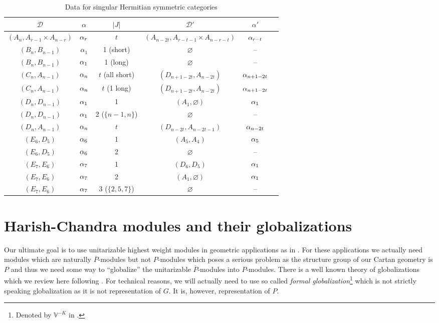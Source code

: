 \begin{table}[H] 
\begin{tabular}{cccccc}
$\mathcal{D}$ &  $\alpha$ & $|J|$ & $\mathcal{D}'$ & $\alpha'$    \\[2pt] \hline 
$(A_n,A_{r-1}\times A_{n-r})$ & $\alpha_r$   & $t$ & $(A_{n-2t},A_{r-t-1}\times A_{n-r-t})$ & $\alpha_{r-t}$ \\
$(B_n,B_{n-1})$ & $\alpha_1$   & 1 (short) & $\varnothing$  & --  \\
$(B_n,B_{n-1})$ & $\alpha_1$   & 1 (long) & $\varnothing$ & --  \\
$(C_n,A_{n-1})$ & $\alpha_n$   & $t$ (all short) & $(D_{n+1-2t},A_{n-2t})$  & $\alpha_{n+1-2t}$  \\
$(C_n,A_{n-1})$ & $\alpha_n$   & $t$ (1 long) & $(D_{n+1-2t},A_{n-2t})$  & $\alpha_{n+1-2t}$ \\
$(D_n,D_{n-1})$ & $\alpha_1$   & 1 & $(A_1,\varnothing)$  & $\alpha_1$  \\
$(D_n,D_{n-1})$ & $\alpha_1$   & 2 ($\{n-1,n\}$) & $\varnothing$  & --   \\
$(D_n,A_{n-1})$ & $\alpha_n$   & $t$ & $(D_{n-2t},A_{n-2t-1})$  & $\alpha_{n-2t}$  \\
$(E_6,D_5)$ & $\alpha_6$   & 1 & $(A_5,A_4)$  & $\alpha_5$ \\
$(E_6,D_5)$ & $\alpha_6$   & 2 & $\varnothing$  & --  \\
$(E_7,E_6)$ & $\alpha_7$   & 1 & $(D_6,D_5)$  & $\alpha_1$   \\
$(E_7,E_6)$ & $\alpha_7$   & 2 & $(A_1,\varnothing)$  & $\alpha_1$  \\
$(E_7,E_6)$ & $\alpha_7$   & 3 ($\{2,5,7\}$) & $\varnothing$  & --   \\[2pt] \hline
\end{tabular}
\medskip
\caption{Data for singular Hermitian symmetric categories}\label{tbl:sing}
\end{table}


\section{Harish-Chandra modules and their globalizations}

Our ultimate goal is to use unitarizable highest weight modules in geometric applications as in \cite{tucek_yamabe_2012}. For these applications we actually need modules which are naturally $\overline{P}$-modules but not $P$-modules which poses a serious problem as the structure group of our Cartan geometry is $P$ and thus we need some way to ``globalize'' the unitarizable $\overline{P}$-modules into $P$-modules. There is a well known theory of globalizations which we review here following \cite{vogan_unitary_2008}. For technical reasons, we will actually need to use so called \emph{formal globalization}\footnote{Denoted by $\mathbb{V}^{-K}$ in \cite{vogan_unitary_2008}.} which is not strictly speaking globalization as it is not representation of $G$. It is, however, representation of $P.$

